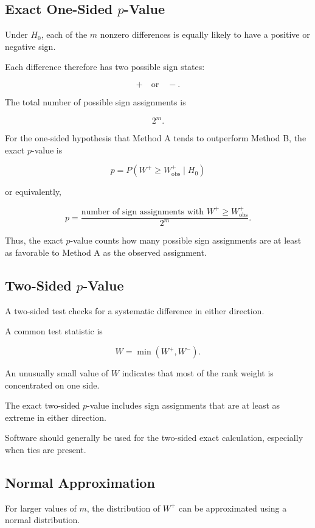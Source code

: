 \documentclass[11pt]{article}
\begin{document}
\subsection{Exact One-Sided \(p\)-Value}

Under \(H_0\), each of the \(m\) nonzero differences is equally likely to
have a positive or negative sign.

Each difference therefore has two possible sign states:

\[
+\quad\text{or}\quad-.
\]

The total number of possible sign assignments is

\[
\boxed{2^m}.
\]

For the one-sided hypothesis that Method A tends to outperform Method B,
the exact \(p\)-value is

\[
\boxed{
p
=
P(W^+\geq W^+_{\mathrm{obs}}\mid H_0)
}
\]

or equivalently,

\[
\boxed{
p
=
\frac{
\text{number of sign assignments with }
W^+\geq W^+_{\mathrm{obs}}
}{
2^m
}.
}
\]

Thus, the exact \(p\)-value counts how many possible sign assignments are
at least as favorable to Method A as the observed assignment.

\subsection{Two-Sided \(p\)-Value}

A two-sided test checks for a systematic difference in either direction.

A common test statistic is

\[
W=\min(W^+,W^-).
\]

An unusually small value of \(W\) indicates that most of the rank weight
is concentrated on one side.

The exact two-sided \(p\)-value includes sign assignments that are at
least as extreme in either direction.

Software should generally be used for the two-sided exact calculation,
especially when ties are present.

\subsection{Normal Approximation}

For larger values of \(m\), the distribution of \(W^+\) can be
approximated using a normal distribution.
\end{document}
